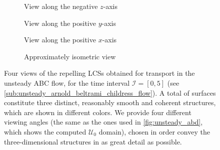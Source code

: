 \begin{figure}[htpb]
    \centering
    \hspace*{\fill}
    \begin{subfigure}[b]{0.42\textwidth}
        \centering
        \caption[]{{\small View along the negative $z$-axis}}
        \label{fig:unsteady_lcss_z}
    \end{subfigure}\hfill%
    \begin{subfigure}[b]{0.42\textwidth}
        \centering
        \caption[]{{\small View along the positive $y$-axis}}
        \label{fig:unsteady_lcss_y}
    \end{subfigure}%
    \hspace*{\fill}

    \hspace*{\fill}
    \begin{subfigure}[b]{0.42\textwidth}
        \centering
        \caption[]{{\small View along the positive $x$-axis}}
        \label{fig:unsteady_lcss_x}
    \end{subfigure}\hfill%
    \begin{subfigure}[b]{0.42\textwidth}
        \centering
        \caption[]{{\small Approximately isometric view}}
        \label{fig:unsteady_lcss_isometric}
    \end{subfigure}%
    \hspace*{\fill}
    \caption[Four views of the repelling LCSs obtained for transport in the
    unsteady ABC flow]
    {
        Four views of the repelling LCSs obtained for transport in the unsteady
        ABC flow, for the time interval $\mathcal{I}=[0,5]$ (see
        \cref{sub:unsteady_arnold_beltrami_childress_flow}). A total of
         surfaces constitute three distinct, reasonably smooth and
        coherent structures, which are shown in different colors. We provide
        four different viewing angles (the same as the ones used in
        \cref{fig:unsteady_abd}, which shows the computed $\mathcal{U}_{0}$
        domain), chosen in order convey the three-dimensional structures in as
        great detail as possible.
}
    \label{fig:unsteady_lcss}
\end{figure}

